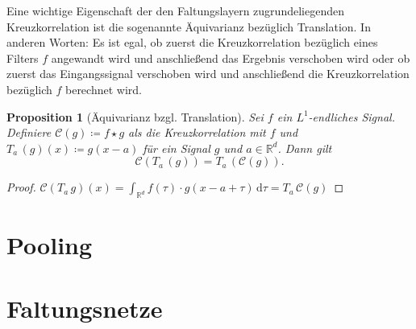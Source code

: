 \documentclass[paper=a4, 	%
		fontsize=11pt, 		%
		abstracton, 	%
		headsepline, 	%
		notitlepage	%
		]{scrartcl}
\newtheorem{proposition}[theorem]{Proposition}
\theoremstyle{definition}
\newcommand{\R}{\mathbb{R}}
\newcommand{\diff}{\,\textrm{d}}
\newcommand{\todo}[1]{{\color{red} #1}}
\newcommand{\transl}[2]{T_{#1}\, #2}
\begin{document}
\todo{
    
Eine wichtige Eigenschaft der den Faltungslayern zugrundeliegenden Kreuzkorrelation ist die sogenannte Äquivarianz bezüglich Translation.
In anderen Worten: Es ist egal, ob zuerst die Kreuzkorrelation bezüglich eines Filters $f$ angewandt wird und anschließend das Ergebnis verschoben wird oder ob zuerst das Eingangssignal verschoben wird und anschließend die Kreuzkorrelation bezüglich $f$ berechnet wird.

\begin{proposition}[Äquivarianz bzgl. Translation]
    Sei $f$ ein $L^1$-endliches Signal.
    Definiere $\mathcal{C}(g)\coloneqq f\star g$ als die Kreuzkorrelation mit $f$ und $\transl{a}{(g)}(x) \coloneqq g(x - a)$ für ein Signal $g$ und $a\in\R^d$.
    Dann gilt \[ \mathcal{C}(\transl{a}{(g)}) = \transl{a}{(\mathcal{C}(g))}. \]
\end{proposition}

\begin{proof}
    $\mathcal{C}(T_a\, g)(x) = \int_{\R^d} f(\tau) \cdot g(x - a + \tau) \diff \tau = \transl{a}{\mathcal{C}(g)}$
\end{proof}

}


\section{Pooling}



\section{Faltungsnetze}


\clearpage          %
\thispagestyle{empty}

\end{document}
